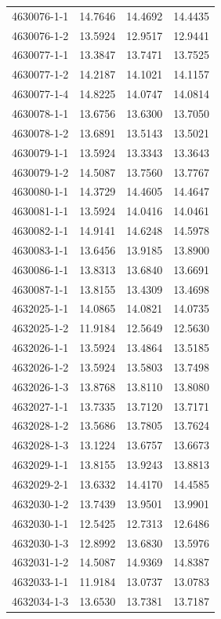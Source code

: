 \begin{longtable}{lrrr}
4630076-1-1 & 14.7646 & 14.4692 & 14.4435 \\
4630076-1-2 & 13.5924 & 12.9517 & 12.9441 \\
4630077-1-1 & 13.3847 & 13.7471 & 13.7525 \\
4630077-1-2 & 14.2187 & 14.1021 & 14.1157 \\
4630077-1-4 & 14.8225 & 14.0747 & 14.0814 \\
4630078-1-1 & 13.6756 & 13.6300 & 13.7050 \\
4630078-1-2 & 13.6891 & 13.5143 & 13.5021 \\
4630079-1-1 & 13.5924 & 13.3343 & 13.3643 \\
4630079-1-2 & 14.5087 & 13.7560 & 13.7767 \\
4630080-1-1 & 14.3729 & 14.4605 & 14.4647 \\
4630081-1-1 & 13.5924 & 14.0416 & 14.0461 \\
4630082-1-1 & 14.9141 & 14.6248 & 14.5978 \\
4630083-1-1 & 13.6456 & 13.9185 & 13.8900 \\
4630086-1-1 & 13.8313 & 13.6840 & 13.6691 \\
4630087-1-1 & 13.8155 & 13.4309 & 13.4698 \\
4632025-1-1 & 14.0865 & 14.0821 & 14.0735 \\
4632025-1-2 & 11.9184 & 12.5649 & 12.5630 \\
4632026-1-1 & 13.5924 & 13.4864 & 13.5185 \\
4632026-1-2 & 13.5924 & 13.5803 & 13.7498 \\
4632026-1-3 & 13.8768 & 13.8110 & 13.8080 \\
4632027-1-1 & 13.7335 & 13.7120 & 13.7171 \\
4632028-1-2 & 13.5686 & 13.7805 & 13.7624 \\
4632028-1-3 & 13.1224 & 13.6757 & 13.6673 \\
4632029-1-1 & 13.8155 & 13.9243 & 13.8813 \\
4632029-2-1 & 13.6332 & 14.4170 & 14.4585 \\
4632030-1-2 & 13.7439 & 13.9501 & 13.9901 \\
4632030-1-1 & 12.5425 & 12.7313 & 12.6486 \\
4632030-1-3 & 12.8992 & 13.6830 & 13.5976 \\
4632031-1-2 & 14.5087 & 14.9369 & 14.8387 \\
4632033-1-1 & 11.9184 & 13.0737 & 13.0783 \\
4632034-1-3 & 13.6530 & 13.7381 & 13.7187 \\

\end{longtable}
